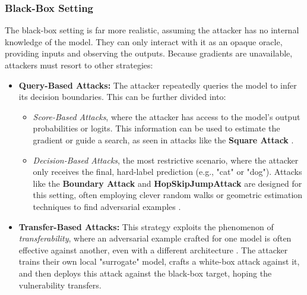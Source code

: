 \documentclass[../main.tex]{subfiles}
\begin{document}
\subsubsection{Black-Box Setting}
The black-box setting is far more realistic, assuming the attacker has no internal knowledge of the model. They can only interact with it as an opaque oracle, providing inputs and observing the outputs. Because gradients are unavailable, attackers must resort to other strategies:
\begin{itemize}
    \item \textbf{Query-Based Attacks:} The attacker repeatedly queries the model to infer its decision boundaries. This can be further divided into:
        \begin{itemize}
            \item \textit{Score-Based Attacks}, where the attacker has access to the model's output probabilities or logits. This information can be used to estimate the gradient or guide a search, as seen in attacks like the \textbf{Square Attack} \cite{andriushchenko2020square}.
            \item \textit{Decision-Based Attacks}, the most restrictive scenario, where the attacker only receives the final, hard-label prediction (e.g., "cat" or "dog"). Attacks like the \textbf{Boundary Attack} and \textbf{HopSkipJumpAttack} are designed for this setting, often employing clever random walks or geometric estimation techniques to find adversarial examples \cite{brendel2018decisionbasedadversarialattacksreliable, chen2020hopskipjumpattackqueryefficientdecisionbasedattack}.
        \end{itemize}
    \item \textbf{Transfer-Based Attacks:} This strategy exploits the phenomenon of \textit{transferability}, where an adversarial example crafted for one model is often effective against another, even with a different architecture \cite{cross_model_transfer, olivier2023transferable}. The attacker trains their own local "surrogate" model, crafts a white-box attack against it, and then deploys this attack against the black-box target, hoping the vulnerability transfers.
\end{itemize}
\end{document}

